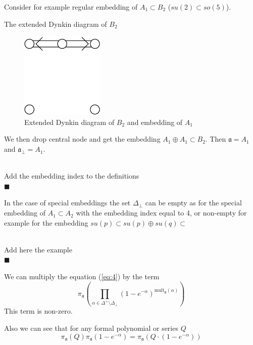 \documentclass[a4paper,12pt]{article}
\theoremstyle{definition} \newtheorem{Def}{Definition}
\newenvironment{comment}
{\par\noindent{\bf TODO}\\}
{\\\hfill$\scriptstyle\blacksquare$\par}
\begin{document}
Consider for example regular embedding of $A_1\subset B_2$ ($su(2)\subset so(5)$). 

The extended Dynkin diagram of $B_2$ 
\begin{figure}[ph]
  \centering
  \includegraphics[width=40mm]{B2_A1_diagram.pdf}
  \caption{Extended Dynkin diagram of $B_2$ and embedding of $A_1$}
  \label{fig:B2Dynkin}
\end{figure}
We then drop central node and get the embedding $A_1\oplus A_1\subset B_2$. Then $\mathfrak{a}=A_1$ and $\mathfrak{a}_{\bot}=A_1$.
\begin{comment}
  Add the embedding index to the definitions
\end{comment}
In the case of special embeddings the set $\Delta_{\bot}$ can be empty as for the special embedding of $A_1\subset A_2$ with the embedding index equal to 4, or non-empty for example for the embedding $su(p)\subset su(p)\oplus su(q)\subset $
\begin{comment}
  Add here the example
\end{comment}


We can multiply the equation (\ref{eq:4}) by the term
\begin{equation}
  \label{eq:5}
  \pi_{\mathfrak{a}}\left(\prod_{\alpha\in \Delta^{+}\setminus \Delta_{\bot}}(1-e^{-\alpha})^{\mathrm{mult}_{\mathfrak{g}}(\alpha)} \right)
\end{equation}
This term is non-zero. 

Also we can see that for any formal polynomial or series $Q$
\begin{equation}
  \label{eq:6}
  \pi_{\mathfrak{a}} (Q) \pi_{\mathfrak{a}}(1-e^{-\alpha})=\pi_{\mathfrak{a}}\left(Q\cdot (1-e^{-\alpha})\right)
\end{equation}
\end{document}
